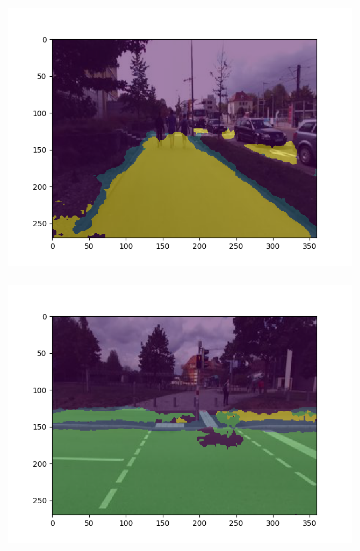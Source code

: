 \begin{figure}
	\begin{subfigure}{.45\textwidth}
		\centering
		\includegraphics[width=\linewidth]{figures/experiments/results-obelix/5.png}
		\caption[Obelix Segmentation Result 5]{}
		\label{fig:obresult-5}
	\end{subfigure}
	\hfill
	\begin{subfigure}{.45\textwidth}
		\centering
		\includegraphics[width=\linewidth]{figures/experiments/results-obelix/6.png}
		\caption[Obelix Segmentation Result 6]{}
		\label{fig:obresult-6}
	\end{subfigure}


\end{figure}
